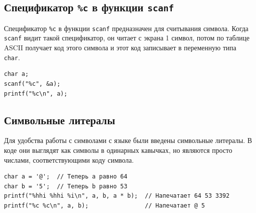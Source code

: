 \documentclass[10pt]{article}
\begin{document}
\subsection*{Спецификатор \texttt{\%c} в функции \texttt{scanf}}
Спецификатор \texttt{\%c} в функции \texttt{scanf} предназначен для считывания символа.
Когда \texttt{scanf} видит такой спецификатор, он читает с экрана 1 символ, потом по таблице ASCII
получает код этого символа и этот код записывает в переменную типа \texttt{char}.
\begin{lstlisting}
char a; 
scanf("%c", &a);
printf("%c\n", a);
\end{lstlisting}

\subsection*{Символьные литералы}
Для удобства работы с символами с языке были введены символьные литералы. В коде они выглядят как символы в одинарных кавычках, но являются просто числами, соответствующими коду символа.
\begin{lstlisting}
char a = '@';  // Теперь a равно 64
char b = '5';  // Теперь b равно 53
printf("%hhi %hhi %i\n", a, b, a * b);  // Напечатает 64 53 3392
printf("%c %c\n", a, b);				// Напечатает @ 5
\end{lstlisting}
\end{document}
